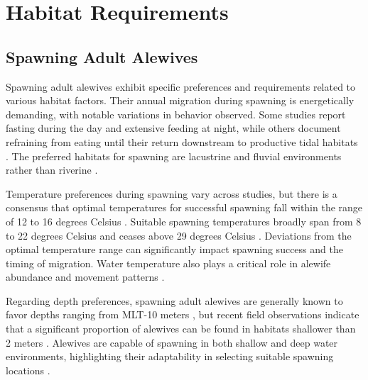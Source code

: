\documentclass[
]{book}
\begin{document}
\hypertarget{habitat-requirements}{%
\section{Habitat Requirements}\label{habitat-requirements}}

\hypertarget{spawning-adult-alewives}{%
\subsection{Spawning Adult Alewives}\label{spawning-adult-alewives}}

Spawning adult alewives exhibit specific preferences and requirements related to various habitat factors. Their annual migration during spawning is energetically demanding, with notable variations in behavior observed. Some studies report fasting during the day and extensive feeding at night, while others document refraining from eating until their return downstream to productive tidal habitats \citep{bigelow_fishes_1953, janssen_feeding_1980, bigelow_bigelow_2002}. The preferred habitats for spawning are lacustrine and fluvial environments rather than riverine \citep{reback_survey_2004, frank_role_2011, overton_spatial_2012}.

Temperature preferences during spawning vary across studies, but there is a consensus that optimal temperatures for successful spawning fall within the range of 12 to 16 degrees Celsius \citep{brown_habitat_2000}. Suitable spawning temperatures broadly span from 8 to 22 degrees Celsius \citep{tyus_movements_1974, pardue_habitat_1983, collette_fishes_2003, mather_assessing_2012} and ceases above 29 degrees Celsius \citep{kissil_spawning_1974, pardue_habitat_1983}. Deviations from the optimal temperature range can significantly impact spawning success and the timing of migration. Water temperature also plays a critical role in alewife abundance and movement patterns \citep{legett_daily_2021}.

Regarding depth preferences, spawning adult alewives are generally known to favor depths ranging from MLT-10 meters \citep{brown_habitat_2000}, but recent field observations indicate that a significant proportion of alewives can be found in habitats shallower than 2 meters \citep{mather_assessing_2012}. Alewives are capable of spawning in both shallow and deep water environments, highlighting their adaptability in selecting suitable spawning locations \citep{oconnell_spawning_1997}.
\end{document}
